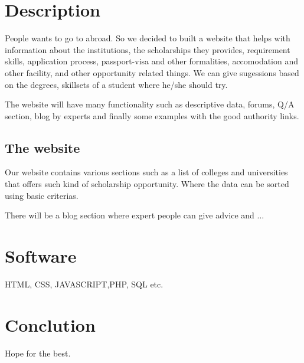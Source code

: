 \documentclass[a4paper,12pt]{report}
\begin{document}
\section*{Description}
People wants to go to abroad. So we decided to built a website that helps with information about the institutions, the scholarships they provides, requirement skills, application process, passport-visa and other formalities, accomodation and other facility, and other opportunity related things. We can give sugessions based on the degrees, skillsets of a student where he/she should try.

The website will have many functionality such as descriptive data, forums, Q/A section, blog by experts and finally some examples with the good authority links.
\subsection*{The website}
Our website contains various sections such as a list of colleges and universities that offers such kind of scholarship opportunity. Where the data can be sorted using basic criterias. 

There will be a blog section where expert people can give advice and ...



\section*{Software}
HTML, CSS, JAVASCRIPT,PHP, SQL etc.
\section*{Conclution}
Hope for the best.
\end{document}
